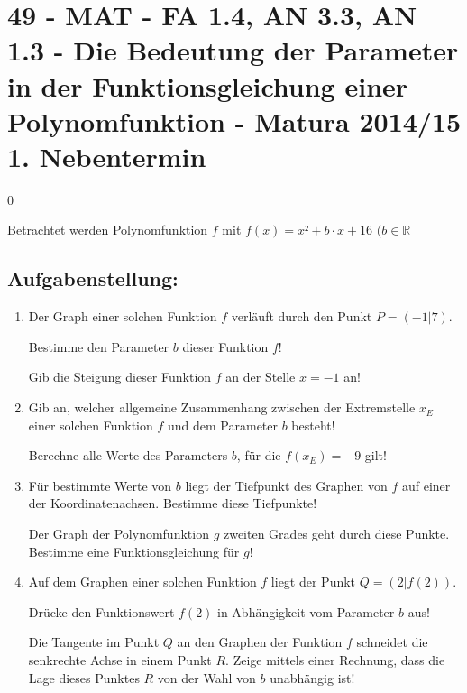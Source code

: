 \section{49 - MAT - FA 1.4, AN 3.3, AN 1.3 - Die Bedeutung der Parameter in der Funktionsgleichung einer Polynomfunktion - Matura 2014/15 1. Nebentermin}

\begin{langesbeispiel} \item[0] %
				
				Betrachtet werden Polynomfunktion $f$ mit $f(x)=x²+b\cdot x+16$ $(b\in\mathbb{R}$

\subsection{Aufgabenstellung:}
\begin{enumerate}
	\item Der Graph einer solchen Funktion $f$ verläuft durch den Punkt $P=(-1|7)$.
	
	 Bestimme den Parameter $b$ dieser Funktion $f$!
	
	Gib die Steigung dieser Funktion $f$ an der Stelle $x=-1$ an!
	
\item Gib an, welcher allgemeine Zusammenhang zwischen der Extremstelle $x_E$ einer solchen Funktion $f$ und dem Parameter $b$ besteht!

Berechne alle Werte des Parameters $b$, für die $f(x_E)=-9$ gilt!

\item Für bestimmte Werte von $b$ liegt der Tiefpunkt des Graphen von $f$ auf einer der Koordinatenachsen. Bestimme diese Tiefpunkte!

Der Graph der Polynomfunktion $g$ zweiten Grades geht durch diese Punkte. Bestimme eine Funktionsgleichung für $g$!

\item Auf dem Graphen einer solchen Funktion $f$ liegt der Punkt $Q=(2|f(2))$.

Drücke den Funktionswert $f(2)$ in Abhängigkeit vom Parameter $b$ aus!

Die Tangente im Punkt $Q$ an den Graphen der Funktion $f$ schneidet die senkrechte Achse in einem Punkt $R$. Zeige mittels einer Rechnung, dass die Lage dieses Punktes $R$ von der Wahl von $b$ unabhängig ist!
						\end{enumerate}\leer
				
\end{langesbeispiel}
